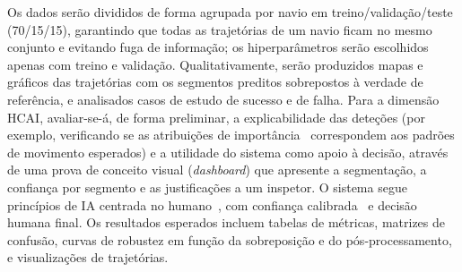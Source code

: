 \documentclass{article}
\begin{document}
Os dados ser\~ao divididos de forma agrupada por navio em treino/valida\c{c}\~ao/teste
(70/15/15), garantindo que todas as trajet\'orias de um navio ficam no mesmo conjunto e
evitando fuga de informa\c{c}\~ao; os hiperpar\^ametros ser\~ao escolhidos apenas com treino
e valida\c{c}\~ao. Qualitativamente, ser\~ao produzidos mapas e gr\'aficos das trajet\'orias
com os segmentos preditos sobrepostos \`a verdade de refer\^encia, e analisados casos de
estudo de sucesso e de falha. Para a dimens\~ao HCAI, avaliar-se-\'a, de forma preliminar, a
explicabilidade das dete\c{c}\~oes (por exemplo, verificando se as atribui\c{c}\~oes de
import\^ancia~\cite{lundberg2017} correspondem aos padr\~oes de movimento esperados) e a
utilidade do sistema como apoio \`a decis\~ao, atrav\'es de uma prova de conceito visual
(\emph{dashboard}) que apresente a segmenta\c{c}\~ao, a confian\c{c}a por segmento e as
justifica\c{c}\~oes a um inspetor. O sistema segue princ\'ipios de IA centrada no
humano~\cite{shneiderman2020}, com confian\c{c}a calibrada~\cite{guo2017} e decis\~ao humana
final. Os resultados esperados incluem tabelas de m\'etricas, matrizes de confus\~ao, curvas
de robustez em fun\c{c}\~ao da sobreposi\c{c}\~ao e do p\'os-processamento, e
visualiza\c{c}\~oes de trajet\'orias.



\end{document}

